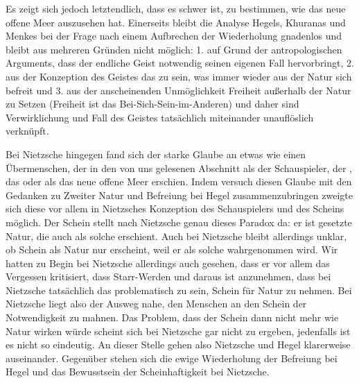 \documentclass[12pt, a4paper, openany]{report}
\begin{document}
Es zeigt sich jedoch letztendlich, dass es schwer ist, zu bestimmen, wie das neue offene Meer auszusehen hat.
Einerseits bleibt die Analyse Hegels, Khuranas und Menkes bei der Frage nach einem Aufbrechen der Wiederholung gnadenlos und bleibt aus mehreren Gründen nicht möglich:
1. auf Grund der antropologischen Arguments, dass der endliche Geist notwendig seinen eigenen Fall hervorbringt,
2. aus der Konzeption des Geistes das zu sein, was immer wieder aus der Natur sich befreit
und 3. aus der anscheinenden Unmöglichkeit Freiheit außerhalb der Natur zu Setzen (Freiheit ist das Bei-Sich-Sein-im-Anderen) und daher sind Verwirklichung und Fall des Geistes tatsächlich miteinander unauflöslich verknüpft.

Bei Nietzsche hingegen fand sich der starke Glaube an etwas wie einen Übermenschen, der in den von uns gelesenen Abschnitt als der Schauspieler, der , das  oder als das neue offene Meer erschien. 
Indem versuch diesen Glaube mit den Gedanken zu Zweiter Natur und Befreiung bei Hegel zusammenzubringen zweigte sich diese vor allem in Nietzsches Konzeption des Schauspielers und des Scheins möglich. 
Der Schein stellt nach Nietzsche genau dieses Paradox da: er ist gesetzte Natur, die auch als solche erschient.
Auch bei Nietzsche bleibt allerdings unklar, ob Schein als Natur nur erscheint, weil er als solche wahrgenommen wird. 
Wir hatten zu Begin bei Nietzsche allerdings auch gesehen, dass er vor allem das Vergessen kritisiert, dass Starr-Werden und daraus ist anzunehmen, dass bei Nietzsche tatsächlich das problematisch zu sein, Schein für Natur zu nehmen.
Bei Nietzsche liegt also der Ausweg nahe, den Menschen an den Schein der Notwendigkeit zu mahnen. 
Das Problem, dass der Schein dann nicht mehr wie Natur wirken würde scheint sich bei Nietzsche gar nicht zu ergeben, jedenfalls ist es nicht so eindeutig. 
An dieser Stelle gehen also Nietzsche und Hegel klarerweise auseinander. 
Gegenüber stehen sich die ewige Wiederholung der Befreiung bei Hegel und das Bewusstsein der Scheinhaftigkeit bei Nietzsche.
\end{document}
